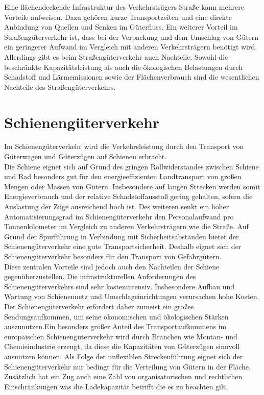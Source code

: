 \documentclass[a4paper,12pt]{scrreprt}
\begin{document}
	Eine flächendeckende Infrastruktur des Verkehrsträgers Straße kann mehrere Vorteile aufweisen. Dazu gehören kurze Transportzeiten und eine direkte Anbindung von Quellen und Senken im Güterfluss. Ein weiterer Vorteil im Straßengüterverkehr ist, dass bei der Verpackung und dem Umschlag von Gütern ein geringerer Aufwand im Vergleich mit anderen Verkehrsträgern benötigt wird.\\
	
	Allerdings gibt es beim Straßengüterverkehr auch Nachteile. Sowohl die beschränkte Kapazitätsleistung als auch die ökologischen Belastungen durch Schadstoff und Lärmemissionen sowie der Flächenverbrauch sind die wesentlichen Nachteile des Straßengüterverkehrs. 
	
	
	\section{Schienengüterverkehr}
	Im Schienengüterverkehr wird die Verkehrsleistung durch den Transport von Güterwagen und Güterzügen auf Schienen erbracht.\\
	
	Die Schiene eignet sich auf Grund des gringen Rollwiderstandes zwischen Schiene und Rad besonders gut für den energieeffizienten Landtransport von großen Mengen oder Massen von Gütern. Insbesondere auf langen Strecken werden somit Energieverbrauch und der relative Schadstoffausstoß gering gehalten, sofern die Auslastung der Züge ausreichend hoch ist. Des weiteren senkt ein hoher Automatisierungsgrad im Schienengüterverkehr den Personalaufwand pro Tonnenkilometer im Vergleich zu anderen Verkehrsträgern wie die Straße. Auf Grund der Spurführung in Verbindung mit Sicherheitsabständen bietet der Schienengüterverkehr eine gute Transportsicherheit. Deshalb eignet sich der Schienengüterverkehr besonders für den Transport von Gefahrgütern.\\
	Diese zentralen Vorteile sind jedoch auch den Nachteilen der Schiene gegenüberzustellen. Die infrastrukturellen Anforderungen des Schienengüterverkehrs sind sehr kostenintensiv. Insbesondere Aufbau und Wartung von Schienennetz und Umschlageinrichtungen verursachen hohe Kosten. Der Schienengüterverkehr erfordert daher zumeist ein großes Sendungsaufkommen, um seine ökonomischen und ökologischen Stärken auszunutzen.Ein besonders großer Anteil des Transportaufkommens im europäischen Schienengüterverkehr wird durch Branchen wie Montan- und Chemieindustrie erzeugt, da diese die Kapazitäten von Güterzügen sinnvoll ausnutzen können. Als Folge der unflexiblen Streckenführung eignet sich der Schienengüterverkehr nur bedingt für die Verteilung von Gütern in der Fläche. Zusätzlich hat ein Zug auch eine Zahl von organisatorischen und rechtlichen Einschränkungen was die Ladekapazität betrifft die es zu beachten gilt. 
	
\end{document}
